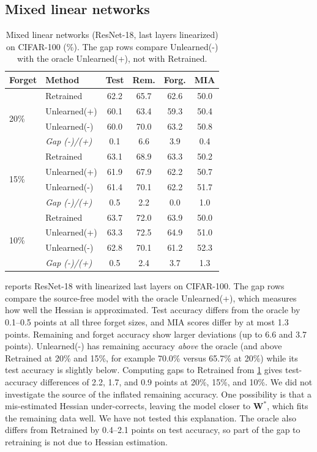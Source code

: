 \documentclass[10pt,twocolumn,letterpaper]{article}
\newcommand{\Wstar}{\mathbf{W}^{*}}
\begin{document}
\subsection{Mixed linear networks}
\begin{table}[t]
\centering
\footnotesize
\setlength{\tabcolsep}{3pt}
\begin{tabular}{@{}llcccc@{}}
\toprule
Forget & Method & Test & Rem. & Forg. & MIA \\
\midrule
\multirow{4}{*}{20\%}
 & Retrained & 62.2 & 65.7 & 62.6 & 50.0 \\
 & Unlearned(+) & 60.1 & 63.4 & 59.3 & 50.4 \\
 & Unlearned(-) & 60.0 & 70.0 & 63.2 & 50.8 \\
 & \emph{Gap (-)/(+)} & 0.1 & 6.6 & 3.9 & 0.4 \\
\midrule
\multirow{4}{*}{15\%}
 & Retrained & 63.1 & 68.9 & 63.3 & 50.2 \\
 & Unlearned(+) & 61.9 & 67.9 & 62.2 & 50.7 \\
 & Unlearned(-) & 61.4 & 70.1 & 62.2 & 51.7 \\
 & \emph{Gap (-)/(+)} & 0.5 & 2.2 & 0.0 & 1.0 \\
\midrule
\multirow{4}{*}{10\%}
 & Retrained & 63.7 & 72.0 & 63.9 & 50.0 \\
 & Unlearned(+) & 63.3 & 72.5 & 64.9 & 51.0 \\
 & Unlearned(-) & 62.8 & 70.1 & 61.2 & 52.3 \\
 & \emph{Gap (-)/(+)} & 0.5 & 2.4 & 3.7 & 1.3 \\
\bottomrule
\end{tabular}
\caption{Mixed linear networks (ResNet-18, last layers linearized) on CIFAR-100 (\%). The gap rows compare Unlearned(-) with the oracle Unlearned(+), not with Retrained.}
\label{tab:mixed}
\end{table}

 reports ResNet-18 with linearized last layers on CIFAR-100. The gap rows compare the source-free model with the oracle Unlearned(+), which measures how well the Hessian is approximated. Test accuracy differs from the oracle by 0.1--0.5 points at all three forget sizes, and MIA scores differ by at most 1.3 points. Remaining and forget accuracy show larger deviations (up to 6.6 and 3.7 points). Unlearned(-) has remaining accuracy \emph{above} the oracle (and above Retrained at 20\% and 15\%, for example 70.0\% versus 65.7\% at 20\%) while its test accuracy is slightly below. Computing gaps to Retrained from \cref{tab:mixed} gives test-accuracy differences of 2.2, 1.7, and 0.9 points at 20\%, 15\%, and 10\%. We did not investigate the source of the inflated remaining accuracy. One possibility is that a mis-estimated Hessian under-corrects, leaving the model closer to $\Wstar$, which fits the remaining data well. We have not tested this explanation. The oracle also differs from Retrained by 0.4--2.1 points on test accuracy, so part of the gap to retraining is not due to Hessian estimation.
\end{document}
